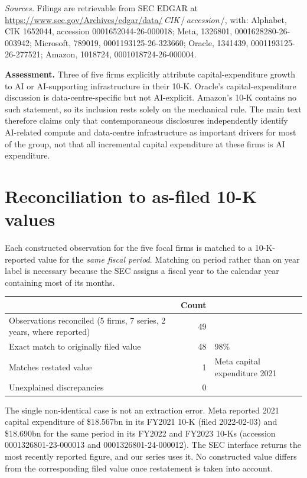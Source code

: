 \documentclass[preprint,11pt]{elsarticle}
\begin{document}
\noindent\footnotesize\textit{Sources.} Filings are retrievable from SEC EDGAR at
\url{https://www.sec.gov/Archives/edgar/data/}\,\textit{CIK}\,/\,\textit{accession}\,/, with:
Alphabet, CIK 1652044, accession 0001652044-26-000018; Meta, 1326801, 0001628280-26-003942;
Microsoft, 789019, 0001193125-26-323660; Oracle, 1341439, 0001193125-26-277521; Amazon, 1018724,
0001018724-26-000004.\normalsize

\medskip\noindent\textbf{Assessment.} Three of five firms explicitly attribute
capital-expenditure growth to AI or AI-supporting infrastructure in their 10-K. Oracle's
capital-expenditure discussion is data-centre-specific but not AI-explicit. Amazon's 10-K contains
no such statement, so its inclusion rests solely on the mechanical rule. The main text therefore
claims only that contemporaneous disclosures independently identify AI-related compute and
data-centre infrastructure as important drivers for most of the group, not that all incremental
capital expenditure at these firms is AI expenditure.

\section{Reconciliation to as-filed 10-K values}\label{app:recon}
Each constructed observation for the five focal firms is matched to a 10-K-reported value for the
\emph{same fiscal period}. Matching on period rather than on year label is necessary because the SEC
assigns a fiscal year to the calendar year containing most of its months.
\begin{center}\footnotesize
\begin{tabular}{@{}p{8.4cm}rl@{}}
\toprule
& Count & \\
\midrule
Observations reconciled (5 firms, 7 series, 2 years, where reported) & 49 & \\
Exact match to originally filed value & 48 & 98\% \\
Matches restated value & 1 & Meta capital expenditure 2021 \\
Unexplained discrepancies & 0 & \\
\bottomrule
\end{tabular}\end{center}
\noindent The single non-identical case is not an extraction error. Meta reported 2021 capital
expenditure of \$18.567bn in its FY2021 10-K (filed 2022-02-03) and \$18.690bn for the same period in
its FY2022 and FY2023 10-Ks (accession 0001326801-23-000013 and 0001326801-24-000012). The SEC
interface returns the most recently reported figure, and our series uses it. No constructed value
differs from the corresponding filed value once restatement is taken into account.
\end{document}
